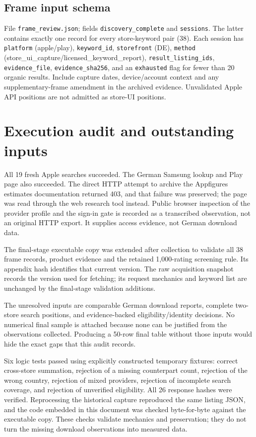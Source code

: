 \documentclass[10pt,a4paper]{article}
\begin{document}
\subsection{Frame input schema}
File \texttt{frame\_review.json}; fields \texttt{discovery\_complete} and
\texttt{sessions}. The latter contains exactly one record for every store-keyword
pair (38). Each session has \texttt{platform} (apple/play),
\texttt{keyword\_id}, \texttt{storefront} (DE), \texttt{method}
(store\_ui\_capture/licensed\_keyword\_report), \texttt{result\_listing\_ids},
\texttt{evidence\_file}, \texttt{evidence\_sha256}, and an \texttt{exhausted}
flag for fewer than 20 organic results. Include capture dates, device/account
context and any supplementary-frame amendment in the archived evidence.
Unvalidated Apple API positions are not admitted as store-UI positions.

\section{Execution audit and outstanding inputs}
All 19 fresh Apple searches succeeded. The German Samsung lookup and Play page
also succeeded. The direct HTTP attempt to archive the Appfigures estimates
documentation returned 403, and that failure was preserved; the page was read
through the web research tool instead. Public browser inspection of the provider
profile and the sign-in gate is recorded as a transcribed observation, not an
original HTTP export. It supplies access evidence, not German download data.

The final-stage executable copy was extended after collection to validate all
38 frame records, product evidence and the retained 1,000-rating screening
rule. Its appendix hash identifies that current version. The raw acquisition
snapshot records the version used for fetching; its request mechanics and
keyword list are unchanged by the final-stage validation additions.

The unresolved inputs are comparable German download reports, complete two-store
search positions, and evidence-backed eligibility/identity decisions. No
numerical final sample is attached because none can be justified from the
observations collected. Producing a 50-row final table without those inputs
would hide the exact gaps that this audit records.

Six logic tests passed using explicitly constructed temporary fixtures: correct
cross-store summation, rejection of a missing counterpart count, rejection of
the wrong country, rejection of mixed providers, rejection of incomplete search
coverage, and rejection of unverified eligibility. All 26 response hashes were
verified. Reprocessing the historical capture reproduced the same listing JSON,
and the code embedded in this document was checked byte-for-byte against the
executable copy. These checks validate mechanics and preservation; they do not
turn the missing download observations into measured data.
\end{document}
